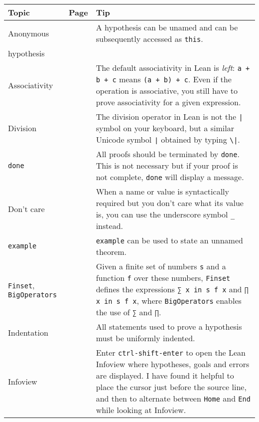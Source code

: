 \begin{tabular}{p{}|r|p{}}
\hline
Topic & Page & Tip\\
\hline
Anonymous&\pageref{p.this}&A hypothesis can be unamed and can be subsequently accessed as \Verb+this+.\\
hypothesis&\\\hline
Associativity&\pageref{p.associativity}&The default associativity in Lean is \emph{left}: \verb!a + b + c! means \verb!(a + b) + c!. Even if the operation is associative, you still have to prove associativity for a given expression.\\\hline

Division&\pageref{p.division}&The division operator in Lean is not the \Verb+|+ symbol on your keyboard, but a similar Unicode symbol \Verb+∣+ obtained by typing \Verb+\|+.\\\hline

\Verb+done+&\pageref{p.done}&All proofs should be terminated by \Verb+done+. This is not necessary but if your proof is not complete, \Verb+done+ will display a message.\\\hline

Don't care&\pageref{p.dont-care}&When a name or value is syntactically required but you don't care what its value is, you can use the underscore symbol \Verb+_+ instead.\\\hline

\Verb+example+&\pageref{p.example}&\Verb+example+ can be used to state an unnamed theorem.\\\hline

\Verb+Finset+, \Verb+BigOperators+&\pageref{p.finset}&Given a finite set of numbers \Verb+s+ and a function \Verb+f+ over these numbers, \Verb+Finset+ defines the expressions \Verb+∑ x in s f x+ and \Verb+∏ x in s f x+, where \Verb+BigOperators+ enables the use of  \Verb+∑+ and \Verb+∏+.\\\hline

Indentation&\pageref{p.indentation}&All statements used to prove a hypothesis must be uniformly indented.\\\hline

Infoview&\pageref{p.infoview}&Enter \Verb+ctrl-shift-enter+ to open the Lean Infoview where hypotheses, goals and errors are displayed. I have found it helpful to place the cursor just before the source line, and then to alternate between \Verb+Home+ and \Verb+End+ while looking at Infoview.\\\hline


\end{tabular}
